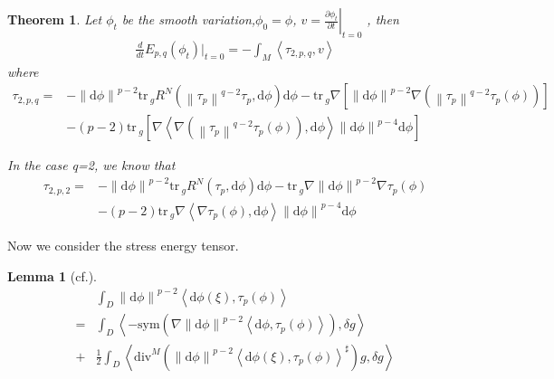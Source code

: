 \documentclass[12pt,UTF8]{article}
\theoremstyle{plain}
\newtheorem{thm}{Theorem}[section]
\newtheorem{lem}{Lemma}
\theoremstyle{definition}
\def\d {\mathrm{d}}
\def\div{\mathrm{div}}
\def\na{\ensuremath{\nabla}}
\renewcommand{\d}[1]{\mathbb{#1}}
\renewcommand{\(}{\left(}
\renewcommand{\)}{\right)}
\DeclareMathOperator{\tr}{tr}
\newcommand{\norm}[1]{\left\lVert#1\right\rVert}%
\def\tr{\mathrm{tr\, }}
\numberwithin{equation}{subsection}
\def\na{\nabla}
\renewcommand{\div}{\mbox{div }}
\newcommand{\tr}{\mbox{tr}}
\renewcommand{\(}{\left(}
\renewcommand{\)}{\right)}
\def\d{\mathrm{d}}
\def \d {\mathrm{d}}
\def \div{\mathrm{div}}
\numberwithin{equation}{section}
\begin{document}
\begin{thm}Let $\phi_t$ be the smooth variation,$\phi_0=\phi$, 
	$v = \left.\frac{\partial\phi_t}{\partial t}\right|_{t=0}$ , then
	\begin{equation}
		\begin{split}
			\frac{d}{d t} E_{p,q}(\phi_t)|_{t=0}=-\int_M \left\langle \tau_{2,p,q}, v \right\rangle
		\end{split}
	\end{equation}
	where
	\begin{equation}
		\begin{split}
			\tau_{2,p,q}=&-\norm{\d \phi}^{p-2}\tr_gR^N(\norm{\tau_p}^{q-2}\tau_p,\d \phi)\d \phi-\tr_g   \na\left[ \norm{\d \phi}^{p-2} \na \left( \norm{\tau_p}^{q-2}\tau_p(\phi) \right)\right] \\
			&-(p-2)\tr_g\left[ \na \left\langle \na \left(\norm{\tau_p}^{q-2} \tau_p(\phi) \right), \d \phi \right\rangle \norm{\d \phi}^{p-4}\d \phi\right] 
		\end{split}
	\end{equation}
	
	In the case q=2, we know that 
	\begin{equation}
		\begin{split}
			\tau_{2,p,2}=&-\norm{\d \phi}^{p-2}\tr_gR^N(\tau_p,\d \phi)\d \phi-\tr_g \na \norm{\d \phi}^{p-2}\na \tau_p(\phi)\\
			&-(p-2)\tr_g\na \left\langle \na \tau_p(\phi), \d \phi \right\rangle \norm{\d \phi}^{p-4}\d \phi
		\end{split}
	\end{equation}
\end{thm}

Now we consider the stress energy tensor.
\begin{lem}[cf.\cite{zbMATH06268870}]
	\begin{equation}
		\begin{split}
			&\int_D \norm{\d \phi}^{p-2}\left\langle \d \phi(\xi), \tau_p(\phi) \right\rangle\\
			=&\int_D\left\langle -\text{sym}(\na \norm{\d \phi}^{p-2}\left\langle \d \phi, \tau_p(\phi) \right\rangle) , \delta g\right\rangle \\
			+&\frac{1}{2} \int_D \left\langle \div^M\left( \norm{\d \phi}^{p-2}\left\langle \d \phi(\xi), \tau_p(\phi) \right\rangle^{\sharp}  \right)g, \delta g \right\rangle
		\end{split}
	\end{equation}
\end{lem}
\end{document}
